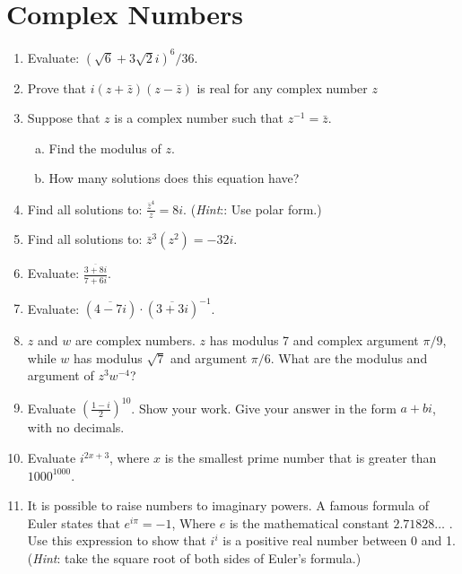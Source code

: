 \section{Complex Numbers}

\begin{enumerate}

\item
Evaluate: $(\sqrt{6}+3\sqrt{2}i)^6/36$.

\item
Prove that  $i(z + \bar{z})(z - \bar{z})$ is real for any complex number $z$

\item
Suppose that $z$ is a complex number such that $z^{-1} = \bar{z}$.
\begin{enumerate}[(a)]
\item
 Find the modulus of $z$.
\item
How many solutions does this equation have?
\end{enumerate}
	
\item
Find all solutions to:  $\displaystyle{\frac{\bar{z}^4}{z} = 8i.}$
(\emph{Hint}:: Use polar form.)

\item
Find all solutions to:  $\bar{z}^3(z^2) = -32i.$
\item
Evaluate:  $\displaystyle{\frac{ \overline{3 + 8i} }{7 + 6i}}$.
\item
Evaluate:  $\displaystyle{( \overline{4 -7i} ) \cdot (\overline{3 + 3i})^{-1}}$.
\item
$z$ and $w$ are complex numbers. $z$ has modulus 7 and complex argument $\pi/9$, while $w$ has modulus $\sqrt{7}$ and argument $\pi/6$.  What are the modulus and argument of $z^3 w^{-4}$?

\item
Evaluate $\left(\frac{1-i}{2}\right)^{10}$.  Show your work. Give your answer in the form $a + bi$, with no decimals.

\item
Evaluate $ i^{2x+3}$, where $x$ is the smallest prime number that is greater than $1000^{1000}$.

\item
It is possible to raise numbers to imaginary powers.  A famous formula of Euler states that   
$e^{i\pi}= -1$, Where $e$ is the mathematical constant  $2.71828 \ldots$ .  Use this expression to show that $i^i$  is a positive real number between 0 and 1.  (\emph{Hint}: take the square root of both sides of Euler's formula.)


\end{enumerate}
